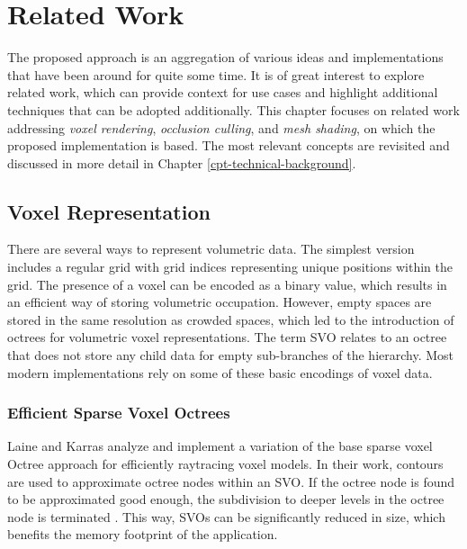 \chapter{Related Work} \label{cpt-related-work}

The proposed approach is an aggregation of various ideas and implementations that have been 
around for quite some time. It is of great interest to explore related work, which can provide 
context for use cases and highlight additional techniques that can be adopted additionally. 
This chapter focuses on related work addressing \emph{voxel rendering}, \emph{occlusion culling}, 
and \emph{mesh shading}, on which the proposed implementation is based. The most relevant concepts 
are revisited and discussed in more detail in Chapter \ref{cpt-technical-background}. 


\section{Voxel Representation} \label{sec-voxel-representation}

There are several ways to represent volumetric data. The simplest version includes a regular 
grid with grid indices representing unique positions within the grid. The presence of a voxel 
can be encoded as a binary value, which results in an efficient way of storing volumetric occupation.
However, empty spaces are stored in the same resolution as crowded spaces, which led to the 
introduction of octrees for volumetric voxel representations. The term \ac{SVO} relates to an 
octree that does not store any child data for empty sub-branches of the hierarchy. Most modern 
implementations rely on some of these basic encodings of voxel data. 


\subsection*{Efficient Sparse Voxel Octrees}

Laine and Karras \cite{Laine2010} analyze and implement a variation of the base sparse voxel Octree approach for 
efficiently raytracing voxel models. In their work, contours are used to approximate octree nodes within an \ac{SVO}. 
If the octree node is found to be approximated good enough, the subdivision to deeper levels in the octree node is 
terminated \cite{Kampe2013,Laine2010}. This way, \ac{SVO}s can be significantly reduced in size, which benefits 
the memory footprint of the application. \\


